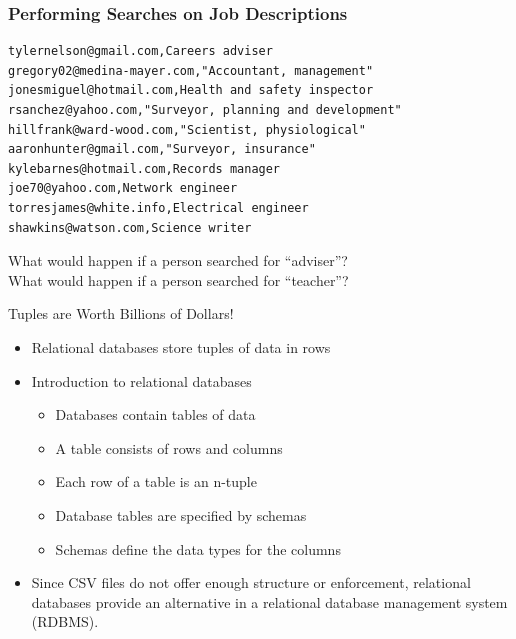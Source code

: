 \documentclass[14pt,aspectratio=169]{beamer}
\begin{document}
%
\begin{frame}[fragile]
  \frametitle{Performing Searches on Job Descriptions}
  \begin{minipage}{6in}
    \vspace*{.15in}
    \begin{verbatim}
tylernelson@gmail.com,Careers adviser
gregory02@medina-mayer.com,"Accountant, management"
jonesmiguel@hotmail.com,Health and safety inspector
rsanchez@yahoo.com,"Surveyor, planning and development"
hillfrank@ward-wood.com,"Scientist, physiological"
aaronhunter@gmail.com,"Surveyor, insurance"
kylebarnes@hotmail.com,Records manager
joe70@yahoo.com,Network engineer
torresjames@white.info,Electrical engineer
shawkins@watson.com,Science writer
    \end{verbatim}
  \end{minipage}
  \vspace*{.05in}
  \begin{center}
    \normalsize \noindent What would happen if a person searched for
    ``adviser''?\\
    \normalsize \noindent What would happen if a person searched for
    ``teacher''?\\
  \end{center}
\end{frame}

%
\begin{frame}{Tuples are Worth Billions of Dollars!}
  \begin{itemize}
    \item Relational databases store tuples of data in rows
      \vspace*{-.15in}
    \item Introduction to relational databases
      \begin{itemize}
        \item Databases contain tables of data
        \item A table consists of rows and columns
        \item Each row of a table is an n-tuple
        \item Database tables are specified by schemas
        \item Schemas define the data types for the columns
      \end{itemize}
      \vspace*{-.2in}
    \item Since CSV files do not offer enough structure or enforcement,
      relational databases provide an alternative in a relational database
      management system (RDBMS).
  \end{itemize}
\end{frame}
\end{document}
